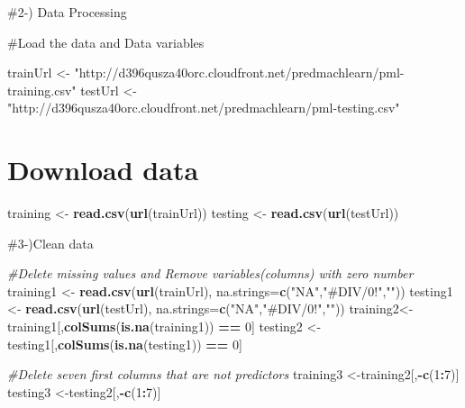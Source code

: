 \documentclass[
]{article}
\newenvironment{Shaded}{\begin{snugshade}}{\end{snugshade}}
\newcommand{\AttributeTok}[1]{\textcolor[rgb]{0.13,0.29,0.53}{#1}}
\newcommand{\CommentTok}[1]{\textcolor[rgb]{0.56,0.35,0.01}{\textit{#1}}}
\newcommand{\DecValTok}[1]{\textcolor[rgb]{0.00,0.00,0.81}{#1}}
\newcommand{\FunctionTok}[1]{\textcolor[rgb]{0.13,0.29,0.53}{\textbf{#1}}}
\newcommand{\NormalTok}[1]{#1}
\newcommand{\OtherTok}[1]{\textcolor[rgb]{0.56,0.35,0.01}{#1}}
\newcommand{\SpecialCharTok}[1]{\textcolor[rgb]{0.81,0.36,0.00}{\textbf{#1}}}
\newcommand{\StringTok}[1]{\textcolor[rgb]{0.31,0.60,0.02}{#1}}
\begin{document}
\#2-) Data Processing

\#Load the data and Data variables

\begin{Shaded}
\begin{Highlighting}[]
\NormalTok{ trainUrl }\OtherTok{\textless{}{-}} \StringTok{"http://d396qusza40orc.cloudfront.net/predmachlearn/pml{-}training.csv"}  
\NormalTok{testUrl }\OtherTok{\textless{}{-}} \StringTok{"http://d396qusza40orc.cloudfront.net/predmachlearn/pml{-}testing.csv"}
\end{Highlighting}
\end{Shaded}

\hypertarget{download-data}{%
\section{Download data}\label{download-data}}

\begin{Shaded}
\begin{Highlighting}[]
\NormalTok{training }\OtherTok{\textless{}{-}} \FunctionTok{read.csv}\NormalTok{(}\FunctionTok{url}\NormalTok{(trainUrl))}
\NormalTok{testing }\OtherTok{\textless{}{-}} \FunctionTok{read.csv}\NormalTok{(}\FunctionTok{url}\NormalTok{(testUrl))}
\end{Highlighting}
\end{Shaded}

\#3-)Clean data

\begin{Shaded}
\begin{Highlighting}[]
\CommentTok{\#Delete missing values and Remove variables(columns) with zero number}
\NormalTok{training1 }\OtherTok{\textless{}{-}} \FunctionTok{read.csv}\NormalTok{(}\FunctionTok{url}\NormalTok{(trainUrl), }\AttributeTok{na.strings=}\FunctionTok{c}\NormalTok{(}\StringTok{"NA"}\NormalTok{,}\StringTok{"\#DIV/0!"}\NormalTok{,}\StringTok{""}\NormalTok{))  }
\NormalTok{testing1 }\OtherTok{\textless{}{-}} \FunctionTok{read.csv}\NormalTok{(}\FunctionTok{url}\NormalTok{(testUrl), }\AttributeTok{na.strings=}\FunctionTok{c}\NormalTok{(}\StringTok{"NA"}\NormalTok{,}\StringTok{"\#DIV/0!"}\NormalTok{,}\StringTok{""}\NormalTok{))}
\NormalTok{training2}\OtherTok{\textless{}{-}}\NormalTok{training1[,}\FunctionTok{colSums}\NormalTok{(}\FunctionTok{is.na}\NormalTok{(training1)) }\SpecialCharTok{==} \DecValTok{0}\NormalTok{]}
\NormalTok{testing2 }\OtherTok{\textless{}{-}}\NormalTok{testing1[,}\FunctionTok{colSums}\NormalTok{(}\FunctionTok{is.na}\NormalTok{(testing1)) }\SpecialCharTok{==} \DecValTok{0}\NormalTok{]}

\CommentTok{\#Delete seven first columns that are not predictors}
\NormalTok{training3   }\OtherTok{\textless{}{-}}\NormalTok{training2[,}\SpecialCharTok{{-}}\FunctionTok{c}\NormalTok{(}\DecValTok{1}\SpecialCharTok{:}\DecValTok{7}\NormalTok{)]}
\NormalTok{testing3 }\OtherTok{\textless{}{-}}\NormalTok{testing2[,}\SpecialCharTok{{-}}\FunctionTok{c}\NormalTok{(}\DecValTok{1}\SpecialCharTok{:}\DecValTok{7}\NormalTok{)]}
\end{Highlighting}
\end{Shaded}
\end{document}
